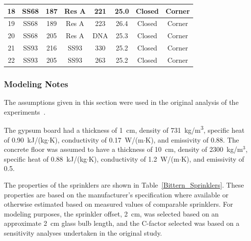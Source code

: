 \begin{table}[!ht]
\begin{tabular}{|c|c|c|c|c|c|c|c|}
18   & SS68   & 187      & Res A  & 221      & 25.0              & Closed & Corner        \\ \hline
19   & SS68   & 189      & Res A  & 223      & 26.4              & Closed & Corner        \\ \hline
20   & SS68   & 205      & Res A  & DNA      & 25.3              & Closed & Corner        \\ \hline
21   & SS93   & 216      & SS93   & 330      & 25.2              & Closed & Corner        \\ \hline
22   & SS93   & 205      & SS93   & 263      & 25.2              & Closed & Corner        \\ \hline
\end{tabular}
\end{table}

\subsubsection{Modeling Notes}

The assumptions given in this section were used in the original analysis of the experiments~\cite{Bittern:Thesis}.

The gypsum board had a thickness of 1~cm, density of 731~kg/m\textsuperscript{3}, specific heat of 0.90~kJ/(kg$\cdot$K), conductivity of 0.17~W/(m$\cdot$K), and emissivity of 0.88. The concrete floor was assumed to have a thickness of 10~cm, density of 2300~kg/m$^3$, specific heat of 0.88~kJ/(kg$\cdot$K), conductivity of 1.2~W/(m$\cdot$K), and emissivity of 0.5.

The properties of the sprinklers are shown in Table~\ref{Bittern_Sprinklers}. These properties are based on the manufacturer's specification where available or otherwise estimated based on measured values of comparable sprinklers. For modeling purposes, the sprinkler offset, 2~cm, was selected based on an approximate 2~cm glass bulb length, and the C-factor selected was based on a sensitivity analyses undertaken in the original study.

